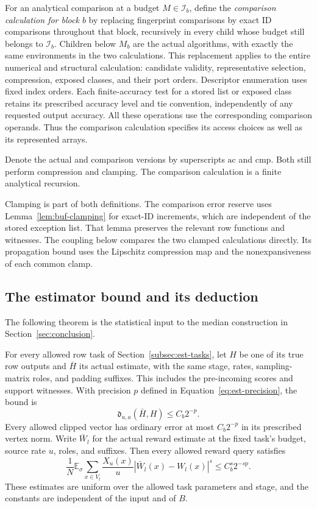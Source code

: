 For an analytical comparison at a budget $M\in\mathcal I_b$, define the
\emph{comparison calculation for block $b$} by replacing fingerprint comparisons by
exact ID comparisons throughout that block, recursively in every child
whose budget still belongs to $\mathcal I_b$.  Children below $M_b$ are
the actual algorithms, with exactly the same environments in the two
calculations.  This replacement applies to the entire numerical and
structural calculation: candidate validity, representative selection,
compression, exposed classes, and their port orders.  Descriptor
enumeration uses fixed index orders.  Each finite-accuracy test for a
stored list or exposed class retains its prescribed accuracy level and
tie convention, independently of any requested output accuracy.  All
these operations use the corresponding comparison operands.  Thus the comparison
calculation specifies its access choices as well as its represented
arrays.

Denote the actual and comparison versions by superscripts $\mathrm{ac}$ and
$\mathrm{cmp}$.  Both still perform compression and clamping.  The comparison
calculation is a finite analytical recursion.

Clamping is part of both definitions.  The comparison error reserve uses
Lemma~\ref{lem:buf-clamping} for exact-ID increments, which are
independent of the stored exception list.  That lemma preserves the
relevant row functions and witnesses.  The coupling below
compares the two clamped calculations directly.  Its propagation bound
uses the Lipschitz compression map and the nonexpansiveness of each
common clamp.

\subsection{The estimator bound and its deduction}

The following theorem is the statistical input to the median construction
in Section~\ref{sec:conclusion}.

\begin{theorem}
\label{thm:fp-estimators}
For every allowed row task of Section~\ref{subsec:est-tasks}, let $H$
be one of its true row outputs and
$\bar H$ its actual estimate, with the same stage, rates, sampling-matrix roles,
and padding suffixes. This includes the pre-incoming scores and support
witnesses. With precision $p$ defined in Equation~\eqref{eq:est-precision}, the bound is
\[
                \mathfrak d_{u,a}(\bar H,H)\le C_b2^{-p}.
\]
Every allowed clipped vector has ordinary error at most $C_b2^{-p}$
in its prescribed vertex norm. Write $\bar W_l$ for the actual reward
estimate at the fixed task's budget, source rate $u$, roles, and suffixes.
Then every allowed reward query satisfies
\begin{equation}
 \frac1N\mathbb E_\sigma\sum_{x\in V_l}\frac{X_u(x)}u
           |\bar W_l(x)-W_l(x)|^s\le C_b^s2^{-sp}.
 \label{eq:fp-reward-bound}
\end{equation}
These estimates are uniform over the allowed task parameters and stage,
and the constants are independent of the input and of $B$.
\end{theorem}

